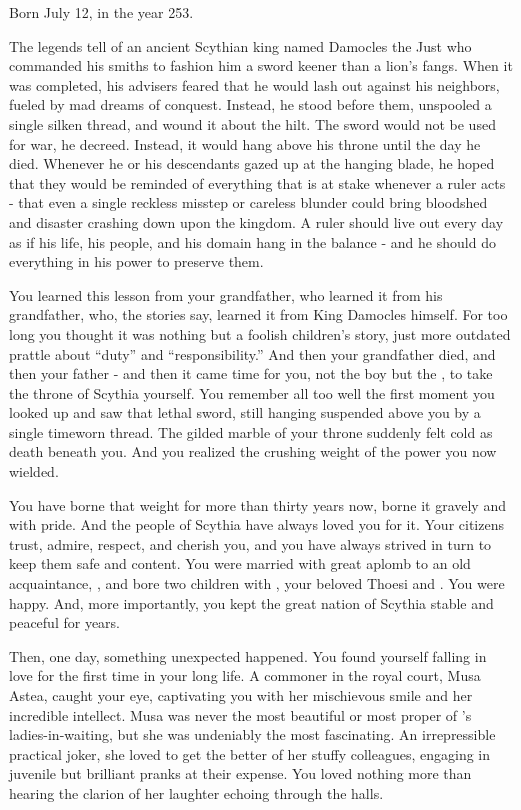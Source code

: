 \documentclass[char]{Kos}
\begin{document}
\name{\cScythiaKing{}}

Born July 12, in the year 253.

The legends tell of an ancient Scythian king named Damocles the Just who commanded his smiths to fashion him a sword keener than a lion's fangs. When it was completed, his advisers feared that he would lash out against his neighbors, fueled by mad dreams of conquest. Instead, he stood before them, unspooled a single silken thread, and wound it about the hilt. The sword would not be used for war, he decreed. Instead, it would hang above his throne until the day he died. Whenever he or his descendants gazed up at the hanging blade, he hoped that they would be reminded of everything that is at stake whenever a ruler acts - that even a single reckless misstep or careless blunder could bring bloodshed and disaster crashing down upon the kingdom. A ruler should live out every day as if his life, his people, and his domain hang in the balance - and he should do everything in his power to preserve them.

    You learned this lesson from your grandfather, who learned it from his grandfather, who, the stories say, learned it from King Damocles himself. For too long you thought it was nothing but a foolish children's story, just more outdated prattle about ``duty'' and ``responsibility.'' And then your grandfather died, and then your father - and then it came time for you, not \cScythiaKing{} the boy but \cScythiaKing{} the \cScythiaKing{\Monarch}, to take the throne of Scythia yourself. You remember all too well the first moment you looked up and saw that lethal sword, still hanging suspended above you by a single timeworn thread. The gilded marble of your throne suddenly felt cold as death beneath you. And you realized the crushing weight of the power you now wielded.

    You have borne that weight for more than thirty years now, borne it gravely and with pride. And the people of Scythia have always loved you for it. Your citizens trust, admire, respect, and cherish you, and you have always strived in turn to keep them safe and content. You were married with great aplomb to an old acquaintance, \cScythiaQueen{}, and bore two children with \cScythiaQueen{\them}, your beloved Thoesi and \cBride{}. You were happy. And, more importantly, you kept the great nation of Scythia stable and peaceful for years.

    Then, one day, something unexpected happened. You found yourself falling in love for the first time in your long life. A commoner in the royal court, Musa Astea, caught your eye, captivating you with her mischievous smile and her incredible intellect. Musa was never the most beautiful or most proper of \cScythiaQueen{}'s ladies-in-waiting, but she was undeniably the most fascinating. An irrepressible practical joker, she loved to get the better of her stuffy colleagues, engaging in juvenile but brilliant pranks at their expense. You loved nothing more than hearing the clarion of her laughter echoing through the halls.
\end{document}
